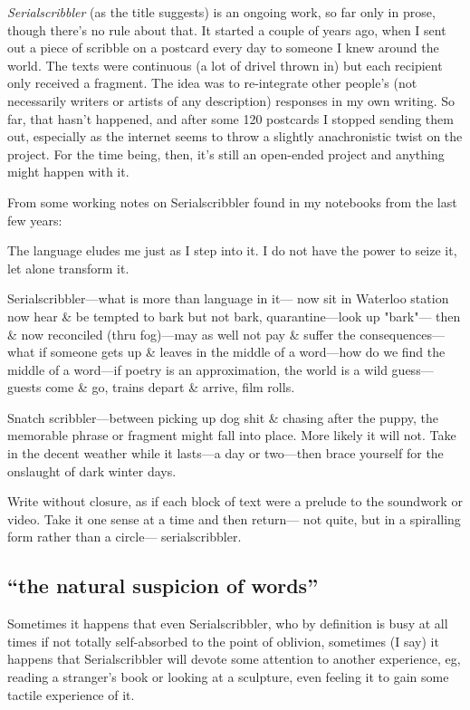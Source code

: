 \documentclass[
]{memoir}
\begin{document}
\emph{Serialscribbler} (as the title suggests) is an ongoing work, so
far only in prose, though there's no rule about that. It started a
couple of years ago, when I sent out a piece of scribble on a postcard
every day to someone I knew around the world. The texts were continuous
(a lot of drivel thrown in) but each recipient only received a fragment.
The idea was to re-integrate other people's (not necessarily writers or
artists of any description) responses in my own writing. So far, that
hasn't happened, and after some 120 postcards I stopped sending them
out, especially as the internet seems to throw a slightly anachronistic
twist on the project. For the time being, then, it's still an open-ended
project and anything might happen with it.

From some working notes on Serialscribbler found in my notebooks from
the last few years:

The language eludes me just as I step into it. I do not have the power
to seize it, let alone transform it.

Serialscribbler---what is more than language in it--- now sit in
Waterloo station now hear \& be tempted to bark but not bark,
quarantine---look up "bark"--- then \& now reconciled (thru fog)---may
as well not pay \& suffer the consequences---what if someone gets up \&
leaves in the middle of a word---how do we find the middle of a
word---if poetry is an approximation, the world is a wild guess---guests
come \& go, trains depart \& arrive, film rolls.

Snatch scribbler---between picking up dog shit \& chasing after the
puppy, the memorable phrase or fragment might fall into place. More
likely it will not. Take in the decent weather while it lasts---a day or
two---then brace yourself for the onslaught of dark winter days.

Write without closure, as if each block of text were a prelude to the
soundwork or video. Take it one sense at a time and then return--- not
quite, but in a spiralling form rather than a circle--- serialscribbler.

\hypertarget{the-natural-suspicion-of-words}{%
\subsection*{``the natural suspicion of
words''}\label{the-natural-suspicion-of-words}}

Sometimes it happens that even Serialscribbler, who by definition is
busy at all times if not totally self-absorbed to the point of oblivion,
sometimes (I say) it happens that Serialscribbler will devote some
attention to another experience, eg, reading a stranger's book or
looking at a sculpture, even feeling it to gain some tactile experience
of it.
\end{document}
